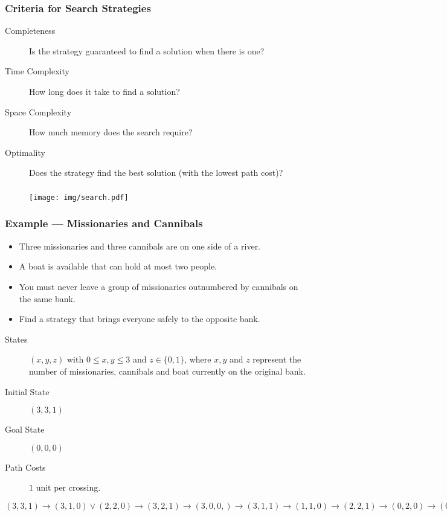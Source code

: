 \documentclass[UTF8,11pt,colorlinks,compress,openany]{beamer}%
\begin{document}
\begin{frame}\frametitle{Criteria for Search Strategies}
\begin{description}
	\item[Completeness] Is the strategy guaranteed to find a solution when there is one?
	\item[Time Complexity] How long does it take to find a solution?
	\item[Space Complexity] How much memory does the search require?
	\item[Optimality] Does the strategy find the best solution (with the lowest path cost)?
\end{description}
\end{frame}

\begin{frame}\frametitle{}
\begin{figure}[H]
	\texttt{[image: img/search.pdf]}
\end{figure}
\end{frame}

\begin{frame}\frametitle{Example --- Missionaries and Cannibals}
\begin{itemize}
	\item Three missionaries and three cannibals are on one side of a river.
	\item A boat is available that can hold at most two people.
	\item You must never leave a group of missionaries outnumbered by cannibals on the same bank.
	\item Find a strategy that brings everyone safely to the opposite bank.
\end{itemize}
\begin{description}
	\item[States] $(x,y,z)$ with $0\leq x,y\leq 3$ and $z\in\{0,1\}$, where $x,y$ and $z$ represent the number of missionaries, cannibals and boat currently on the original bank.
	\item[Initial State] $(3,3,1)$
	\item[Goal State] $(0,0,0)$
	\item[Path Costs] $1$ unit per crossing.
\end{description}
$(3,3,1)\to(3,1,0)\vee(2,2,0)\to(3,2,1)\to(3,0,0,)\to(3,1,1)\to(1,1,0)\to(2,2,1)\to(0,2,0)\to(0,3,1)\to(0,1,0)\to(0,2,1)\vee(1,1,1)\to(0,0,0)$
\end{frame}
\end{document}
